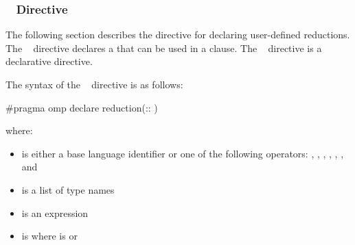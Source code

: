 \subsubsection{~ Directive}
\label{subsubsec:declare reduction Directive}
\summary
The following section describes the directive for declaring user-defined 
reductions. The ~ directive declares a 
 that can be used in a  clause. 
The ~ directive is a declarative directive.

\syntax
\begin{cspecific}
The syntax of the ~ directive is as follows:

\begin{ompcPragma}
#pragma omp declare reduction(::
)
\end{ompcPragma}

where:

\begin{itemize}
\item {} is either a base language identifier or one of 
      the following operators: \code{+}, \code{-}, \code{*}, \code{&}, \code{|},
      \code{^}, \code{&&} and \code{||}
\item {} is a list of type names
\item {} is an expression
\item {} is \code{)}
      where  is\linebreak
       or \code{(}\code{)}
\end{itemize}
\end{cspecific}

